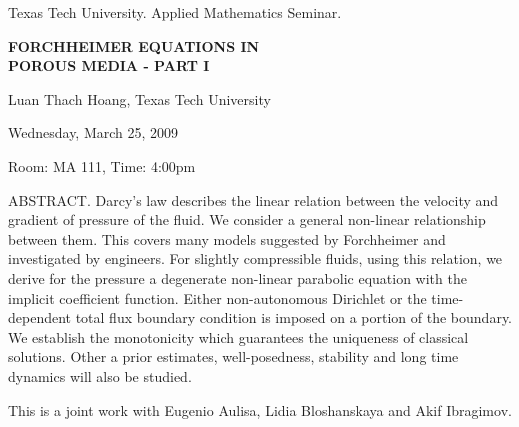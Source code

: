\documentclass[oneside]{amsart}
\begin{document}
\begin{center}
Texas Tech University.  Applied Mathematics Seminar.

\end{center}

\begin{center}

{\LARGE \uppercase{\textbf{
Forchheimer equations in\\ porous media - Part I
}}}

Luan Thach Hoang, Texas Tech University

Wednesday, March 25, 2009

Room: MA 111, Time: 4:00pm

\end{center}

ABSTRACT.
Darcy's law describes the linear relation between
the velocity and gradient of pressure of the fluid. We consider a general non-linear relationship between them. This covers many
models suggested by Forchheimer and investigated by
engineers. For slightly compressible fluids, using this
relation, we derive for the pressure a degenerate non-linear parabolic
equation with the implicit coefficient function. Either non-autonomous
Dirichlet or the time-dependent total flux boundary condition is imposed
on a portion of the boundary. We establish the monotonicity which
guarantees the uniqueness of classical solutions.  Other a prior
estimates, well-posedness, stability and long time dynamics will also be
studied.

This is a joint work with Eugenio Aulisa, Lidia Bloshanskaya and Akif Ibragimov.
\end{document}
